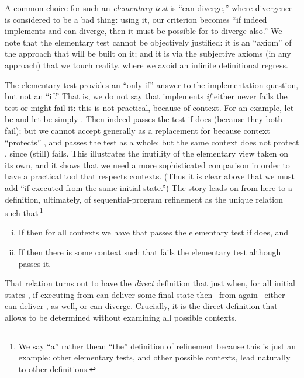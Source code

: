\documentclass[runningheads]{llncs}
\begin{document}
A common choice for such an \emph{elementary test} is ``can diverge,'' where divergence is considered to be a bad thing: using it, our criterion becomes ``if  indeed implements  and  can diverge, then it must be possible for  to diverge also.'' We note that the elementary test cannot be objectively justified: it is an ``axiom'' of the approach that will be built on it; and it is via the subjective axioms (in any approach) that we touch reality, where we avoid an infinite definitional regress.

The elementary test provides an ``only if'' answer to the implementation question, but not an ``if.'' That is, we do not say that  implements  \emph{if} either  never fails the test or  might fail it: this is not practical, because of context. For an example, let  be  and let  be simply . Then indeed  passes the test if  does (because they both fail); but we cannot accept  generally as a replacement for  because context  ``protects'' , and passes the test as a whole; but the same context does not protect , since  (still) fails. This illustrates the inutility of the elementary view taken on its own, and it shows that we need a more sophisticated comparison in order to have a practical tool that respects contexts. (Thus it is clear above that we must add ``if executed from the same initial state.'') The story leads on from here to a definition, ultimately, of sequential-program refinement  as the unique relation such that\,\footnote{We say ``a'' rather thean ``the'' definition of refinement because this is just an example: other elementary tests, and other possible contexts, lead naturally to other definitions.}
\begin{enumerate}[(i)]
\item\label{i1253} If  then for all contexts  we have that  passes the elementary test if  does, and
\item\label{i1254} If  then there is some context  such that  fails the elementary test although  passes it.
\end{enumerate}
That relation turns out to have the \emph{direct} definition that  just when, for all initial states ,
if executing  from  can deliver some final state  then --from  again-- either  can deliver , as well, or  can diverge. Crucially, it is the direct definition that allows  to be determined without examining all possible contexts.
\end{document}
